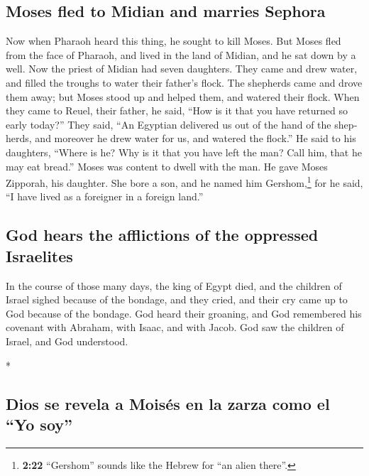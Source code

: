 \begin{paracol}{2}
\begin{otherlanguage}{english}
{\subsection{Moses fled to Midian and marries
Sephora}\label{moses-fled-to-midian-and-marries-sephora}}

 Now when Pharaoh heard this thing, he sought to kill
Moses. But Moses fled from the face of Pharaoh, and lived in the land of
Midian, and he sat down by a well.  Now the priest of
Midian had seven daughters. They came and drew water, and filled the
troughs to water their father's flock.  The shepherds
came and drove them away; but Moses stood up and helped them, and
watered their flock.  When they came to Reuel, their
father, he said, ``How is it that you have returned so early today?''
 They said, ``An Egyptian delivered us out of the hand of
the shepherds, and moreover he drew water for us, and watered the
flock.''  He said to his daughters, ``Where is he? Why is
it that you have left the man? Call him, that he may eat bread.''
 Moses was content to dwell with the man. He gave Moses
Zipporah, his daughter.  She bore a son, and he named him
Gershom,\footnote{\textbf{2:22} ``Gershom'' sounds like the Hebrew for
  ``an alien there''.} for he said, ``I have lived as a foreigner in a
foreign land.''

\hypertarget{god-hears-the-afflictions-of-the-oppressed-israelites}{%
\subsection{God hears the afflictions of the oppressed
Israelites}\label{god-hears-the-afflictions-of-the-oppressed-israelites}}

 In the course of those many days, the king of Egypt
died, and the children of Israel sighed because of the bondage, and they
cried, and their cry came up to God because of the bondage.
 God heard their groaning, and God remembered his
covenant with Abraham, with Isaac, and with Jacob.  God
saw the children of Israel, and God understood.

\end{otherlanguage}

\switchcolumn[0]*

\hypertarget{dios-se-revela-a-moisuxe9s-en-la-zarza-como-el-yo-soy}{%
\subsection{Dios se revela a Moisés en la zarza como el ``Yo
soy''}\label{dios-se-revela-a-moisuxe9s-en-la-zarza-como-el-yo-soy}}


\end{paracol}
